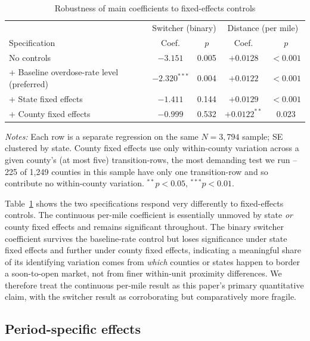 \documentclass[preprint,12pt,authoryear]{elsarticle}
\begin{document}
\begin{table}[htbp]
\centering
\caption{Robustness of main coefficients to fixed-effects controls}
\label{tab:fe}
\begin{tabular}{@{}lcccc@{}}
\toprule
 & \multicolumn{2}{c}{Switcher (binary)} & \multicolumn{2}{c}{Distance (per mile)} \\
Specification & Coef. & $p$ & Coef. & $p$ \\
\midrule
No controls & $-3.151$ & 0.005 & $+0.0128$ & $<0.001$ \\
+ Baseline overdose-rate level (preferred) & $-2.320^{***}$ & 0.004 & $+0.0122$ & $<0.001$ \\
+ State fixed effects & $-1.411$ & 0.144 & $+0.0129$ & $<0.001$ \\
+ County fixed effects & $-0.999$ & 0.532 & $+0.0122^{**}$ & 0.023 \\
\bottomrule
\end{tabular}
\vspace{2pt}
\begin{minipage}{0.92\textwidth}
\footnotesize\emph{Notes:} Each row is a separate regression on the
same $N=3{,}794$ sample; SE clustered by state. County fixed effects
use only within-county variation across a given county's (at most
five) transition-rows, the most demanding test we run -- 225 of 1,249
counties in this sample have only one transition-row and so contribute
no within-county variation. $^{**}p<0.05$, $^{***}p<0.01$.
\end{minipage}
\end{table}

Table~\ref{tab:fe} shows the two specifications respond very
differently to fixed-effects controls. The continuous per-mile
coefficient is essentially unmoved by state \emph{or} county fixed
effects and remains significant throughout. The binary switcher
coefficient survives the baseline-rate control but loses significance
under state fixed effects and further under county fixed effects,
indicating a meaningful share of its identifying variation comes from
\emph{which} counties or states happen to border a soon-to-open
market, not from finer within-unit proximity differences. We therefore
treat the continuous per-mile result as this paper's primary
quantitative claim, with the switcher result as corroborating but
comparatively more fragile.

\subsection{Period-specific effects}
\label{sec:periodeffects}
\end{document}
